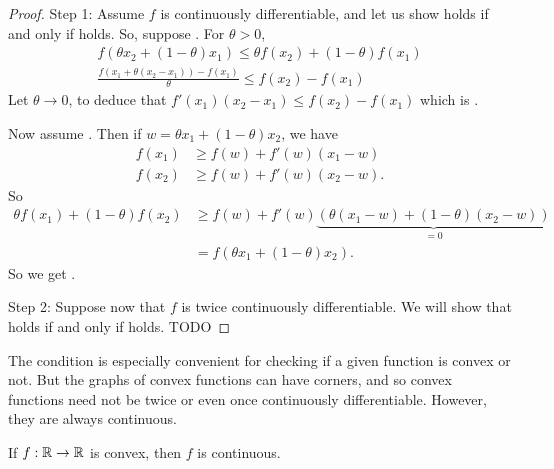 \begin{proof}
Step 1:
Assume $f$ is continuously differentiable, and let us show  holds if and only if  holds.
So, suppose .
For $\theta > 0$, 
\begin{align}
f(\theta x_2 + (1-\theta) x_1) \le \theta f(x_2) + (1-\theta) f(x_1) \\
\frac{f(x_1 + \theta (x_2 - x_1)) - f(x_1)}{\theta} \le f(x_2) - f(x_1)
\end{align}
Let $\theta \to 0$, to deduce that $f'(x_1) (x_2 - x_1) \le f(x_2) - f(x_1)$ which is .

Now assume .
Then if $w = \theta x_1 + (1-\theta) x_2$, we have
\begin{align}
f(x_1) & \ge f(w) + f'(w) (x_1-w) \\
f(x_2) & \ge f(w) + f'(w) (x_2-w).
\end{align}
So
\begin{align}
\theta f(x_1) + (1-\theta) f(x_2) & \ge f(w) + f'(w) \underbrace{( \theta (x_1 - w) + (1-\theta) (x_2 - w) )}_{=0} \\
& = f(\theta x_1 + (1-\theta) x_2 ).
\end{align}
So we get .

Step 2:
Suppose now that $f$ is twice continuously differentiable. 
We will show that  holds if and only if  holds.
TODO
\end{proof}

The condition  is especially convenient for checking if a given function is convex or not.
But the graphs of convex functions can have corners, and so convex functions need not be twice or even once continuously differentiable.
However, they are always continuous.

\begin{theorem}
If $f:\mathbb{R} \to \mathbb{R}$ is convex, then $f$ is continuous.
\end{theorem}

